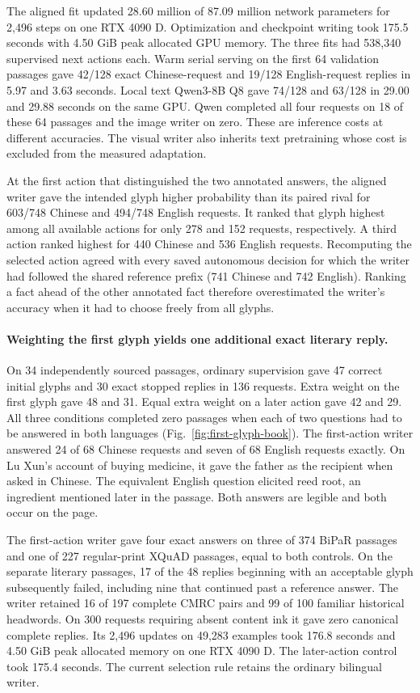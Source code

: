 \documentclass[12pt,a4paper]{article}
\providecommand{\DIFadd}[1]{{\protect\color{blue} \sf #1}} %
\begin{document}
\DIFadd{The aligned fit updated 28.60 million of 87.09 million network parameters for 2,496 steps on one RTX 4090 D. Optimization and checkpoint writing took 175.5 seconds with 4.50 GiB peak allocated GPU memory. The three fits had 538,340 supervised next actions each. Warm serial serving on the first 64 validation passages gave 42/128 exact Chinese-request and 19/128 English-request replies in 5.97 and 3.63 seconds. Local text Qwen3-8B Q8 gave 74/128 and 63/128 in 29.00 and 29.88 seconds on the same GPU. Qwen completed all four requests on 18 of these 64 passages and the image writer on zero. These are inference costs at different accuracies. The visual writer also inherits text pretraining whose cost is excluded from the measured adaptation.
}

\DIFadd{At the first action that distinguished the two annotated answers, the aligned writer gave the intended glyph higher probability than its paired rival for 603/748 Chinese and 494/748 English requests. It ranked that glyph highest among all available actions for only 278 and 152 requests, respectively. A third action ranked highest for 440 Chinese and 536 English requests. Recomputing the selected action agreed with every saved autonomous decision for which the writer had followed the shared reference prefix (741 Chinese and 742 English). Ranking a fact ahead of the other annotated fact therefore overestimated the writer's accuracy when it had to choose freely from all glyphs.
}

\paragraph{\DIFadd{Weighting the first glyph yields one additional exact literary reply.}}
\DIFadd{On 34 independently sourced passages, ordinary supervision gave 47 correct initial glyphs and 30 exact stopped replies in 136 requests. Extra weight on the first glyph gave 48 and 31. Equal extra weight on a later action gave 42 and 29. All three conditions completed zero passages when each of two questions had to be answered in both languages (Fig.~\ref{fig:first-glyph-book}). The first-action writer answered 24 of 68 Chinese requests and seven of 68 English requests exactly. On Lu Xun's account of buying medicine, it gave the father as the recipient when asked in Chinese. The equivalent English question elicited reed root, an ingredient mentioned later in the passage. Both answers are legible and both occur on the page.
}

\DIFadd{The first-action writer gave four exact answers on three of 374 BiPaR passages and one of 227 regular-print XQuAD passages, equal to both controls. On the separate literary passages, 17 of the 48 replies beginning with an acceptable glyph subsequently failed, including nine that continued past a reference answer. The writer retained 16 of 197 complete CMRC pairs and 99 of 100 familiar historical headwords. On 300 requests requiring absent content ink it gave zero canonical complete replies. Its 2,496 updates on 49,283 examples took 176.8 seconds and 4.50 GiB peak allocated memory on one RTX 4090 D. The later-action control took 175.4 seconds. The current selection rule retains the ordinary bilingual writer.
}
\end{document}
